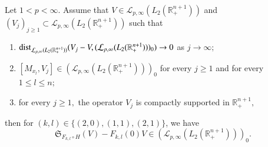 \documentclass[12pt]{amsart}
\begin{document}
\begin{lemma}\label{criterion lemma}
Let $1<p<\infty$. Assume that $V\in \mathcal{L}_{p,\infty}(L_2(\mathbb{R}^{n+1}_+))$ and $(V_j)_{j\geq1}\subset \mathcal{L}_{p,\infty}(L_2(\mathbb{R}^{n+1}_+))$ such that
\begin{enumerate}[{\rm (i)}]
\item\label{cla} ${\rm dist}_{\mathcal{L}_{p,\infty}(L_2(\mathbb{R}^{n+1}_+))}(V_j-V,(\mathcal{L}_{p,\infty}(L_2(\mathbb{R}^{n+1}_+)))_0)\to 0$ as $j\to\infty;$
\item\label{clb} $[M_{x_l},V_j]\in (\mathcal{L}_{p,\infty}(L_2(\mathbb{R}^{n+1}_+)))_0$ for every $j\geq1$ and for every $1\leq l\leq n;$
\item\label{clc} for every $j\geq 1,$ the operator $V_j$ is compactly supported in $\mathbb{R}^{n+1}_+,$
\end{enumerate}	
then for $(k,l)\in \{(2,0),(1,1),(2,1)\}$, we have
$$\mathfrak{S}_{F_{k,l}\circ H}(V)-F_{k,l}(0)V\in(\mathcal{L}_{p,\infty}(L_2(\mathbb{R}^{n+1}_+)))_0.$$
\end{lemma}
\end{document}
